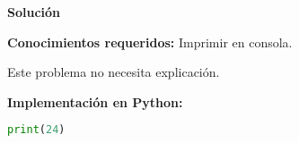 \vspace*{0cm}
{\Large\textbf{Solución}}

\textbf{Conocimientos requeridos:} Imprimir en consola.

Este problema no necesita explicación.

\textbf{Implementación en Python:}

\begin{lstlisting}[language=Python]
print(24)
\end{lstlisting}

\newpage

